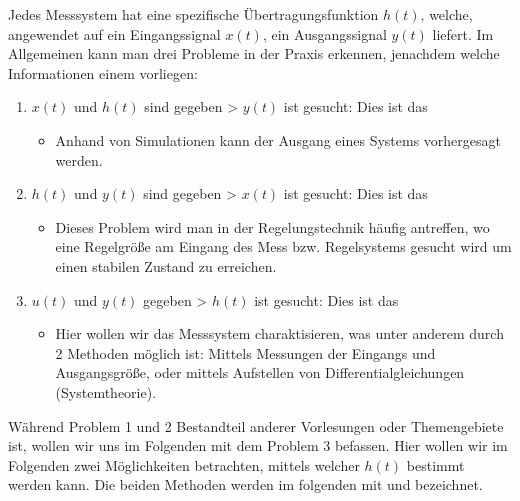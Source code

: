 \documentclass[letterpaper,10pt,english]{jupyterBook}
\begin{document}
\sphinxAtStartPar
Jedes Messsystem hat eine spezifische Übertragungsfunktion \(h(t)\), welche, angewendet auf ein Eingangssignal \(x(t)\), ein Ausgangssignal \(y(t)\) liefert. Im Allgemeinen kann man drei Probleme in der Praxis erkennen, jenachdem welche Informationen einem vorliegen:
\begin{enumerate}
%
\item {} 
\sphinxAtStartPar
\(x(t)\) und \(h(t)\) sind gegeben \sphinxhyphen{}> \(y(t)\) ist gesucht: Dies ist das 
\begin{itemize}
\item {} 
\sphinxAtStartPar
Anhand von Simulationen kann der Ausgang eines Systems vorhergesagt werden.

\end{itemize}

\item {} 
\sphinxAtStartPar
\(h(t)\) und \(y(t)\) sind gegeben \sphinxhyphen{}> \(x(t)\) ist gesucht: Dies ist das 
\begin{itemize}
\item {} 
\sphinxAtStartPar
Dieses Problem wird man in der Regelungstechnik häufig antreffen, wo eine Regelgröße am Eingang des Mess\sphinxhyphen{} bzw. Regelsystems gesucht wird um einen stabilen Zustand zu erreichen.

\end{itemize}

\item {} 
\sphinxAtStartPar
\(u(t)\) und \(y(t)\) gegeben \sphinxhyphen{}> \(h(t)\) ist gesucht: Dies ist das 
\begin{itemize}
\item {} 
\sphinxAtStartPar
Hier wollen wir das Messsystem charaktisieren, was unter anderem durch 2 Methoden möglich ist: Mittels Messungen der Eingangs\sphinxhyphen{} und Ausgangsgröße, oder mittels Aufstellen von Differentialgleichungen (Systemtheorie).

\end{itemize}

\end{enumerate}

\sphinxAtStartPar
Während Problem 1 und 2 Bestandteil anderer Vorlesungen oder Themengebiete ist, wollen wir uns im Folgenden mit dem Problem 3 befassen. Hier wollen wir im Folgenden zwei Möglichkeiten betrachten, mittels welcher \(h(t)\) bestimmt werden kann. Die beiden Methoden werden im folgenden mit  und  bezeichnet.
\end{document}
